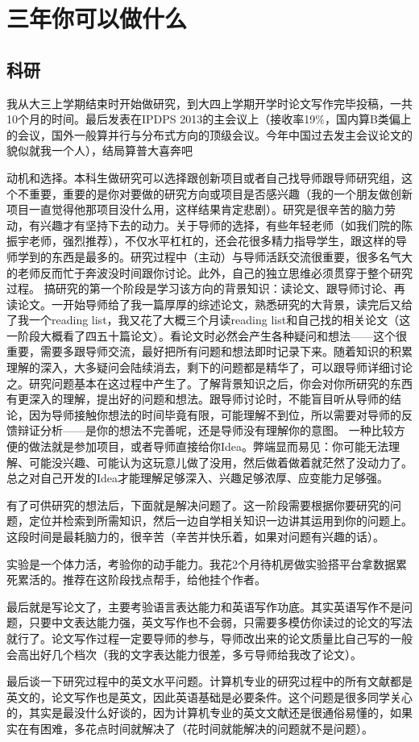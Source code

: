 \chapter{三年你可以做什么}
\newpage
\section{科研}
我从大三上学期结束时开始做研究，到大四上学期开学时论文写作完毕投稿，一共10个月的时间。最后发表在IPDPS 2013的主会议上（接收率19\%，国内算B类偏上的会议，国外一般算并行与分布式方向的顶级会议。今年中国过去发主会议论文的貌似就我一个人），结局算普大喜奔吧~\par

动机和选择。本科生做研究可以选择跟创新项目或者自己找导师跟导师研究组，这个不重要，重要的是你对要做的研究方向或项目是否感兴趣（我的一个朋友做创新项目一直觉得他那项目没什么用，这样结果肯定悲剧）。研究是很辛苦的脑力劳动，有兴趣才有坚持下去的动力。关于导师的选择，有些年轻老师（如我们院的陈振宇老师，强烈推荐），不仅水平杠杠的，还会花很多精力指导学生，跟这样的导师学到的东西是最多的。研究过程中（主动）与导师活跃交流很重要，很多名气大的老师反而忙于奔波没时间跟你讨论。此外，自己的独立思维必须贯穿于整个研究过程。
搞研究的第一个阶段是学习该方向的背景知识：读论文、跟导师讨论、再读论文。一开始导师给了我一篇厚厚的综述论文，熟悉研究的大背景，读完后又给了我一个reading list，我又花了大概三个月读reading list和自己找的相关论文（这一阶段大概看了四五十篇论文）。看论文时必然会产生各种疑问和想法——这个很重要，需要多跟导师交流，最好把所有问题和想法即时记录下来。随着知识的积累理解的深入，大多疑问会陆续消去，剩下的问题都是精华了，可以跟导师详细讨论之。研究问题基本在这过程中产生了。了解背景知识之后，你会对你所研究的东西有更深入的理解，提出好的问题和想法。跟导师讨论时，不能盲目听从导师的结论，因为导师接触你想法的时间毕竟有限，可能理解不到位，所以需要对导师的反馈辩证分析——是你的想法不完善呢，还是导师没有理解你的意图。    一种比较方便的做法就是参加项目，或者导师直接给你Idea。弊端显而易见：你可能无法理解、可能没兴趣、可能认为这玩意儿做了没用，然后做着做着就茫然了没动力了。总之对自己开发的Idea才能理解足够深入、兴趣足够浓厚、应变能力足够强。\par
有了可供研究的想法后，下面就是解决问题了。这一阶段需要根据你要研究的问题，定位并检索到所需知识，然后一边自学相关知识一边讲其运用到你的问题上。这段时间是最耗脑力的，很辛苦（辛苦并快乐着，如果对问题有兴趣的话）。\par
实验是一个体力活，考验你的动手能力。我花2个月待机房做实验搭平台拿数据累死累活的。推荐在这阶段找点帮手，给他挂个作者。\par
最后就是写论文了，主要考验语言表达能力和英语写作功底。其实英语写作不是问题，只要中文表达能力强，英文写作也不会弱，只需要多模仿你读过的论文的写法就行了。论文写作过程一定要导师的参与，导师改出来的论文质量比自己写的一般会高出好几个档次（我的文字表达能力很差，多亏导师给我改了论文）。\par
最后谈一下研究过程中的英文水平问题。计算机专业的研究过程中的所有文献都是英文的，论文写作也是英文，因此英语基础是必要条件。这个问题是很多同学关心的，其实是最没什么好谈的，因为计算机专业的英文文献还是很通俗易懂的，如果实在有困难，多花点时间就解决了（花时间就能解决的问题就不是问题）。


